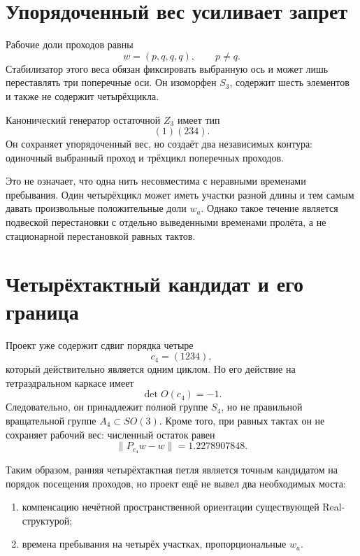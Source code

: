 \section{Упорядоченный вес усиливает запрет}

Рабочие доли проходов равны
\begin{equation}
 w=(p,q,q,q),
 \qquad p\ne q.
\end{equation}
Стабилизатор этого веса обязан фиксировать выбранную ось и может лишь
переставлять три поперечные оси. Он изоморфен $S_3$, содержит шесть
элементов и также не содержит четырёхцикла.

Канонический генератор остаточной $Z_3$ имеет тип
\begin{equation}
 (1)(234).
\end{equation}
Он сохраняет упорядоченный вес, но создаёт два независимых контура:
одиночный выбранный проход и трёхцикл поперечных проходов.

Это не означает, что одна нить несовместима с неравными временами
пребывания. Один четырёхцикл может иметь участки разной длины и тем самым
давать произвольные положительные доли $w_a$. Однако такое течение является
подвеской перестановки с отдельно выведенными временами пролёта, а не
стационарной перестановкой равных тактов.

\section{Четырёхтактный кандидат и его граница}

Проект уже содержит сдвиг порядка четыре
\begin{equation}
 c_4=(1234),
\end{equation}
который действительно является одним циклом. Но его действие на
тетраэдральном каркасе имеет
\begin{equation}
 \det O(c_4)=-1.
\end{equation}
Следовательно, он принадлежит полной группе $S_4$, но не правильной
вращательной группе $A_4\subset SO(3)$. Кроме того, при равных тактах он
не сохраняет рабочий вес: численный остаток равен
\begin{equation}
 \|P_{c_4}w-w\|=1.2278907848.
\end{equation}

Таким образом, ранняя четырёхтактная петля является точным кандидатом на
порядок посещения проходов, но проект ещё не вывел два необходимых моста:

\begin{enumerate}\raggedright
 \item компенсацию нечётной пространственной ориентации существующей
 Real-структурой;
 \item времена пребывания на четырёх участках, пропорциональные $w_a$.
\end{enumerate}

